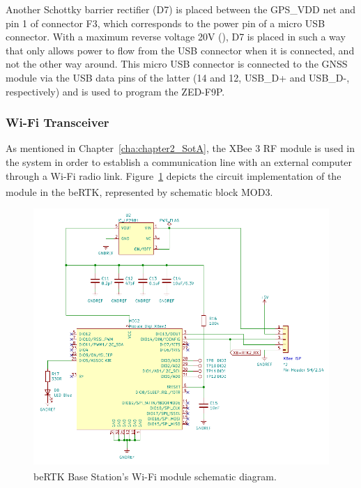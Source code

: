 Another Schottky barrier rectifier (D7) is placed between the GPS\_VDD net and pin 1 of connector F3, which corresponds to the power pin of a micro USB connector. With a maximum reverse voltage 20V (\cite{PMEG2010ER}), D7 is placed in such a way that only allows power to flow from the USB connector when it is connected, and not the other way around. This micro USB connector is connected to the GNSS module via the USB data pins of the latter (14 and 12, USB\_D+ and USB\_D-, respectively) and is used to program the ZED-F9P.



\subsubsection{Wi-Fi Transceiver}\label{sec:3233_XBEE3}

As mentioned in Chapter~\ref{cha:chapter2_SotA}, the XBee 3 RF module is used in the system in order to establish a communication line with an external computer through a Wi-Fi radio link. Figure~\ref{fig:XBEE3_circuit} depicts the circuit implementation of the module in the beRTK\textsuperscript{\textregistered}, represented by schematic block MOD3.

\begin{figure}[h]
	\centering
	\includegraphics[width=1.0\textwidth]{Chapters/Figures/chapter3/Modules_XBEE3.pdf}
	\caption{beRTK\textsuperscript{\textregistered} Base Station's Wi-Fi module schematic diagram.}
	\label{fig:XBEE3_circuit}
\end{figure}

